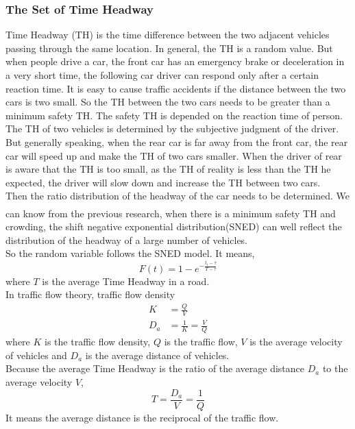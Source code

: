 \documentclass{mcmthesis}
\newcommand{\upcite}[1]{\textsuperscript{\textsuperscript{\cite{#1}}}}
\begin{document}
\subsubsection{The Set of Time Headway}
\indent Time Headway (TH) is the time difference between the two adjacent vehicles passing through the same location. In general, the TH is a random value. But when people drive a car, the front car has an emergency brake or deceleration in a very short time, the following car driver can respond only after a certain reaction time. It is easy to cause traffic accidents if the distance between the two cars is two small. So the TH between the two cars needs to be greater than a minimum safety TH. The safety TH is depended on the reaction time of person.\\
\indent The TH of two vehicles is determined by the subjective judgment of the driver. But generally speaking, when the rear car is far away from the front car, the rear car will speed up and make the TH of two cars smaller. When the driver of rear is aware that the TH is too small, as the TH of reality is less than the TH he expected, the driver will slow down and increase the TH between two cars.\\
\indent Then the ratio distribution of the headway of the car needs to be determined. We can know from the previous research\upcite{TH}, when there is a minimum safety TH and crowding, the shift negative exponential distribution(SNED) can well reflect the distribution of the headway of a large number of vehicles.\\
\indent So the random variable follows the SNED model. It means,
\begin{equation}
		F(t)=1-e^{-\frac{t_{i}-\tau }{T-\tau}}
\end{equation}
\indent where $T$ is the average Time Headway in a road.\\ 

\indent In traffic flow theory, traffic flow density\\
\begin{equation}
\begin{split}
 K &= \frac{Q}{V}\\
 D_{a}&=\frac{1}{K}=\frac{V}{Q}
\end{split}
\end{equation}
\indent where $K$ is the traffic flow density, $Q$ is the traffic flow, $V$ is the average velocity of vehicles and $D_{a}$ is the average distance of vehicles.\\
\indent Because the average Time Headway is the ratio of the average distance $D_{a}$ to the average velocity $V $,\\
\begin{equation}
	T=\frac{D_{a}}{V}=\frac{1}{Q}
\end{equation}
\indent It means the average distance is the reciprocal of the traffic flow.
\end{document}

